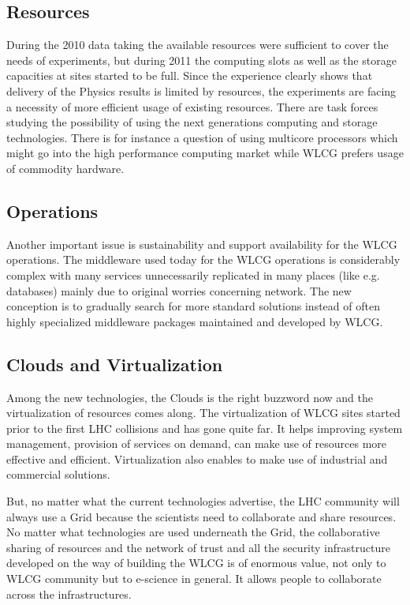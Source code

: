 \documentclass{intech}
\begin{document}
\subsection{Resources}
%
During the 2010 data taking the available resources were sufficient
to cover the needs of experiments, but during 2011 the computing
slots as well as the storage capacities at sites started to be full.
Since the experience clearly shows that delivery of the Physics
results is limited by resources, the experiments are facing a
necessity of more efficient usage of existing resources. There are
task forces studying the possibility of using the next generations
computing and storage technologies. There is for instance a question
of using multicore processors which might go into the high
performance computing market while WLCG prefers usage of commodity
hardware.

\subsection{Operations}
%
Another important issue is sustainability and support
availability for the WLCG operations. The middleware used today for
the WLCG operations is considerably complex with many services
unnecessarily replicated in many places (like e.g. databases) mainly
due to original worries concerning network. The new conception is to
gradually search for more standard solutions instead of often highly
specialized middleware packages maintained and developed by WLCG.

\subsection{Clouds and Virtualization}
%
Among the new technologies, the Clouds is the right buzzword now and
the virtualization of resources comes along. The virtualization of
WLCG sites started prior to the first LHC collisions and has gone
quite far. It helps improving system management, provision of
services on demand, can make use of resources more effective and
efficient. Virtualization also enables to make use of industrial and
commercial solutions.

But, no matter what the current technologies advertise, the LHC
community will always use a Grid because the scientists need to
collaborate and share resources. No matter what technologies are
used underneath the  Grid, the collaborative sharing of resources
and the network of trust and all the security infrastructure
developed on the way of building the WLCG is of enormous value, not
only to WLCG community but to e-science in general. It allows people
to collaborate across the infrastructures.
\end{document}

